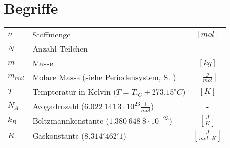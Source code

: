 \section{Begriffe}
\begin{table}[h!]
\begin{tabular}{p{} l c}
$n$		
	& Stoffmenge 		
	& $[mol]$ \\
$N$		
	& Anzahl Teilchen 	
	& - \\
$m$		
	& Masse 		
	& $[kg]$ \\
$m_{mol}$	
	& Molare Masse (siehe Periodensystem, S. \pageref{fig:persys})	
	& $\left[\frac{g}{mol}\right]$ \\
$T$		
	& Tempteratur in Kelvin  ($T = T_{^\circ C} + 273.15 ^\circ C$) 
	& $[K]$ \\
$N_A$	
	& Avogadrozahl ($6.022~141~3 \cdot 10^{23} \frac{1}{mol}$) 
	& - \\
$k_B$		
	& Boltzmannkonstante ($1.380~648~8 \cdot 10^{-23}$)
	& $\left[\frac{J}{K}\right]$ \\ 
$R$	
	& Gaskonstante ($8.314'462'1$)
	& $\left[\frac{J}{mol \cdot K}\right]$
\end{tabular}
\end{table}
